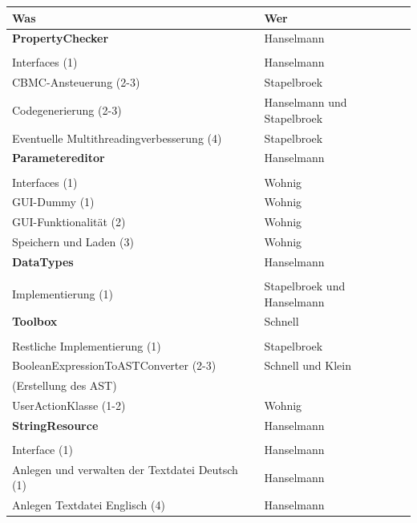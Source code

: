 \documentclass[a4paper]{scrreprt}
\begin{document}
\begin{tabular}{ | p{7cm} | p{7cm} |}
	\hline
	Was & Wer\\
	\hline
	
	\rule{0pt}{15pt}\textbf {PropertyChecker} & Hanselmann\\
	&\\
	\hline
	Interfaces (1) & Hanselmann\\
	\hline
	CBMC-Ansteuerung (2-3) & Stapelbroek \\
	\hline
	Codegenerierung (2-3) & Hanselmann und Stapelbroek \\
	\hline
	Eventuelle Multithreadingverbesserung (4) & Stapelbroek \\
	\hline
	
	\rule{0pt}{15pt}\textbf {Parametereditor} & Hanselmann \\
	&\\
	\hline
	Interfaces (1) & Wohnig\\
	\hline
	GUI-Dummy (1) & Wohnig\\
	\hline
	GUI-Funktionalität (2) & Wohnig\\
	\hline
	Speichern und Laden (3) & Wohnig\\
	\hline
	
	\rule{0pt}{15pt}\textbf {DataTypes} & Hanselmann\\
	&\\
	\hline
	Implementierung (1) & Stapelbroek und Hanselmann\\
	\hline	
	
	\rule{0pt}{15pt}\textbf {Toolbox} & Schnell\\
	&\\
	\hline	
	Restliche Implementierung (1) & Stapelbroek \\
	\hline	
	BooleanExpressionToASTConverter (2-3)  & Schnell und Klein\\
	(Erstellung des AST) &\\
	\hline
	UserActionKlasse (1-2) & Wohnig\\
	\hline
	
	\rule{0pt}{15pt}\textbf {StringResource} & Hanselmann\\
	&\\
	\hline	
	Interface (1) & Hanselmann \\
	\hline
	Anlegen und verwalten der Textdatei Deutsch (1) & Hanselmann \\
	\hline
	Anlegen Textdatei Englisch (4) & Hanselmann \\
	\hline
	
	
	

\end{tabular}
\end{document}
